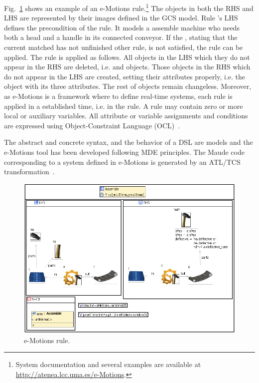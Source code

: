 Fig.~\ref{fig:assemble} shows an example of an e-Motions rule.\footnote{System documentation and several examples are available at \url{http://atenea.lcc.uma.es/e-Motions}.} The objects in both the RHS and LHS are represented by their images defined in the GCS model. Rule 's LHS defines the precondition of the rule. It models a assemble machine who needs both a head and a handle in its connected conveyor. If the , stating that the current matched  has not unfinished other rule, is not satisfied, the rule can be applied. The rule is applied as follows. All objects in the LHS which they do not appear in the RHS are deleted, i.e.  and  objects. Those objects in the RHS which do not appear in the LHS are created, setting their attributes properly, i.e. the  object with its three attributes. The rest of objects remain changeless. Moreover, as e-Motions is a framework where to define real-time systems, each rule is applied in a established time, i.e.  in the  rule. A rule may contain zero or more local or auxiliary variables. All attribute or variable assignments and conditions are expressed using Object-Constraint Language (OCL)~\cite{ocl}.

The abstract and concrete syntax, and the behavior of a DSL are models and the e-Motions tool has been developed following MDE principles. The Maude code corresponding to a system defined in e-Motions is generated by an ATL/TCS transformation~\cite{atl}.

\begin{figure}[htp]
  \centering
  \includegraphics[width=\textwidth]{imgs/assemble}
  \caption{e-Motions  rule.}\label{fig:assemble}
\end{figure}

